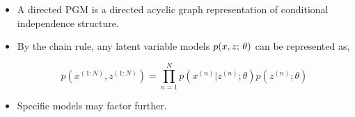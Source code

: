 \begin{frame}
    
    \begin{itemize}
        \item A directed PGM is a directed acyclic graph representation of conditional independence structure. 
        \item  By the chain rule, any  latent variable models $p(x, z ; \, \theta)$ can be represented as, 
        \begin{figure}
        \centering
                \[ p(x^{(1:N)}, z^{(1:N)}) = \prod_{n=1}^N p(x^{(n)} | z^{(n)}; \theta) p(z^{(n)};\theta) \]
 
         \end{figure}
                 \item Specific models may factor further.

    \end{itemize}
        

\end{frame}



